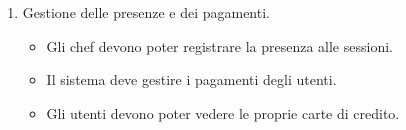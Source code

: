 \begin{enumerate}
    \item Gestione delle presenze e dei pagamenti.
    \begin{itemize}
        \item Gli chef devono poter registrare la presenza alle sessioni.
        \item Il sistema deve gestire i pagamenti degli utenti.
        \item Gli utenti devono poter vedere le proprie carte di credito.
    \end{itemize}
\end{enumerate}


